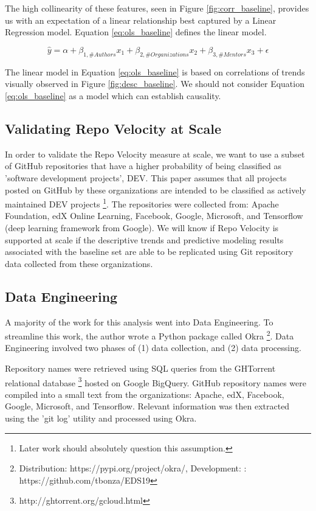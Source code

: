 \documentclass{article}
\begin{document}
The high collinearity of these features, seen in Figure
\ref{fig:corr_baseline}, provides us with an expectation of a linear
relationship best captured by a Linear Regression model. Equation
\ref{eq:ols_baseline} defines the linear model.

\begin{equation}
  \label{eq:ols_baseline}
  \hat{y} = \alpha + \beta_{1, \# Authors}x_1 + \beta_{2, \# Organizations}
  x_2 + \beta_{3, \# Mentors}x_3 + \epsilon
\end{equation}

The linear model in Equation \ref{eq:ols_baseline} is based on correlations
of trends visually observed in Figure \ref{fig:desc_baseline}. We should
not consider Equation \ref{eq:ols_baseline} as a model which can establish
causality.

\subsection{Validating Repo Velocity at Scale}

In order to validate the Repo Velocity measure at scale, we want to
use a subset of GitHub repositories that have a higher probability of
being classified as 'software development projects', DEV. This paper assumes
that all projects posted on GitHub by these organizations are intended to
be classified as actively maintained DEV projects \footnote{Later work should absolutely question this assumption.}. The repositories were collected
from: Apache Foundation, edX Online Learning, Facebook, Google, Microsoft,
and Tensorflow (deep learning framework from Google). We will know if
Repo Velocity is supported at scale if the descriptive trends and predictive
modeling results associated with the baseline set are able to be replicated
using Git repository data collected from these organizations.

\subsection{Data Engineering}

A majority of the work for this analysis went into Data Engineering. To
streamline this work, the author wrote a Python package called
Okra \footnote{Distribution: https://pypi.org/project/okra/, Development: : https://github.com/tbonza/EDS19}. Data Engineering involved two phases of
(1) data collection, and (2) data processing.

Repository names were retrieved using SQL queries from the GHTorrent
relational database \footnote{http://ghtorrent.org/gcloud.html} hosted on
Google BigQuery. GitHub repository names were compiled into a small text
from the organizations: Apache, edX, Facebook, Google, Microsoft, and
Tensorflow. Relevant information was then extracted using the 'git log'
utility and processed using Okra.
\end{document}
